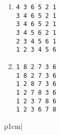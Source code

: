 \begin{answer}
\begin{enumerate}
\item 
\begin{verbatim}
4 3 6 5 2 1
3 4 6 5 2 1
3 4 6 5 2 1
3 4 5 6 2 1
2 3 4 5 6 1
1 2 3 4 5 6
\end{verbatim}

\item 
\begin{verbatim}
1 8 2 7 3 6
1 8 2 7 3 6
1 2 8 7 3 6
1 2 7 8 3 6
1 2 3 7 8 6
1 2 3 6 7 8
\end{verbatim}
\end{enumerate}
\end{answer}
p{1cm}|
